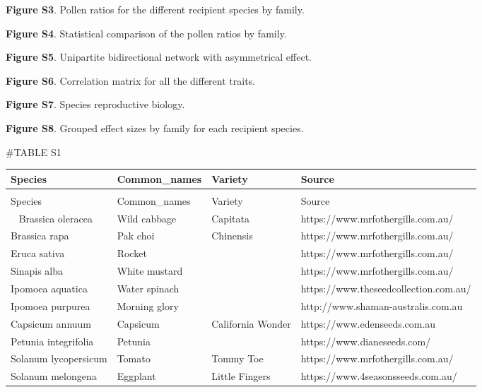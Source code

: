 \documentclass[
  12pt,
]{article}
\begin{document}
\textbf{Figure S3}. Pollen ratios for the different recipient species by
family.

\textbf{Figure S4}. Statistical comparison of the pollen ratios by
family.

\textbf{Figure S5}. Unipartite bidirectional network with asymmetrical
effect.

\textbf{Figure S6}. Correlation matrix for all the different traits.

\textbf{Figure S7}. Species reproductive biology.

\textbf{Figure S8}. Grouped effect sizes by family for each recipient
species.

\newpage

\#TABLE S1 \begingroup\fontsize{7}{9}\selectfont

\begin{longtabu} to 
\toprule
\textbf{Species} & \textbf{Common\_names} & \textbf{Variety} & \textbf{Source}\\
\midrule
\endfirsthead
{}\\
\toprule
Species & Common\_names & Variety & Source\\
\midrule
\endhead
\
\endfoot
\bottomrule
\endlastfoot
{}  Brassica oleracea & Wild cabbage & Capitata & https://www.mrfothergills.com.au/\\
\addlinespace
Brassica rapa & Pak choi & Chinensis & https://www.mrfothergills.com.au/\\
\addlinespace
{}  Eruca sativa & Rocket &  & https://www.mrfothergills.com.au/\\
\addlinespace
Sinapis alba & White mustard &  & https://www.mrfothergills.com.au/\\
\addlinespace
{}  Ipomoea aquatica & Water spinach &  & https://www.theseedcollection.com.au/\\
\addlinespace
Ipomoea purpurea & Morning glory &  & http://www.shaman-australis.com.au\\
\addlinespace
{}  Capsicum annuum & Capsicum & California Wonder & https://www.edenseeds.com.au\\
\addlinespace
Petunia integrifolia & Petunia &  & https://www.dianeseeds.com/\\
\addlinespace
{}  Solanum lycopersicum & Tomato & Tommy Toe & https://www.mrfothergills.com.au/\\
\addlinespace
Solanum melongena & Eggplant & Little Fingers & https://www.4seasonsseeds.com.au/\\*
\end{longtabu}
\endgroup{}
\end{document}
